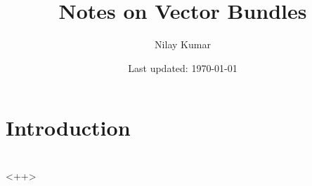 \documentclass{../../mathnotes}
\title{Notes on Vector Bundles}
\author{Nilay Kumar}
\date{Last updated: \today}
\begin{document}
\maketitle

\setcounter{section}{-1}

\section{Introduction}


\section{}<++>






















\end{document}
